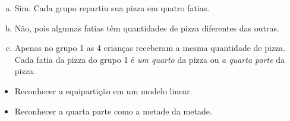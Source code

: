 \begin{multicols}{2}
\begin{solucao}{}{}
\begin{enumerate} [a),wide,labelindent=0pt] %
    \item       Sim. Cada grupo repartiu sua pizza em quatro fatias.
    \item       Não, pois algumas fatias têm quantidades de pizza diferentes das outras.
    \item       Apenas no grupo 1 as 4 crianças receberam a mesma quantidade de pizza. Cada fatia da pizza do grupo 1 é {\it um quarto} da pizza ou {\it a quarta parte} da pizza.
\end{enumerate} %
\end{solucao}



\begin{objetivos}{}{}
\begin{itemize} %
    \item       Reconhecer a equipartição em um modelo linear.
    \item       Reconhecer a quarta parte como a metade da metade.
\end{itemize} %
\end{objetivos}


\end{multicols}

